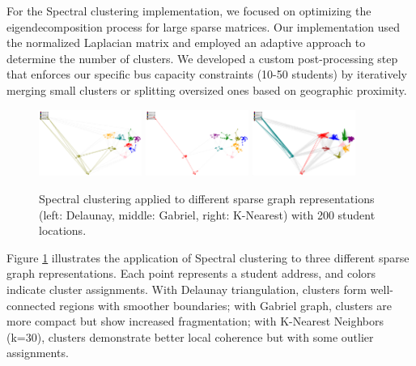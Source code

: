 For the Spectral clustering implementation, we focused on optimizing the eigendecomposition process for large sparse matrices. Our implementation used the normalized Laplacian matrix and employed an adaptive approach to determine the number of clusters. We developed a custom post-processing step that enforces our specific bus capacity constraints (10-50 students) by iteratively merging small clusters or splitting oversized ones based on geographic proximity.

\begin{figure}[htbp]
\centering
\includegraphics[width=0.3\textwidth]{./img/Spectral_Delaunay}
\hspace{0.2cm}
\includegraphics[width=0.3\textwidth]{./img/Spectral_Gabriel}
\hspace{0.2cm}
\includegraphics[width=0.3\textwidth]{./img/Spectral_K}

\caption{Spectral clustering applied to different sparse graph representations (left: Delaunay, middle: Gabriel, right: K-Nearest) with 200 student locations.}
\label{fig:spectral_clustering}
\end{figure}

Figure \ref{fig:spectral_clustering} illustrates the application of Spectral clustering to three different sparse graph representations. Each point represents a student address, and colors indicate cluster assignments. With Delaunay triangulation, clusters form well-connected regions with smoother boundaries; with Gabriel graph, clusters are more compact but show increased fragmentation; with K-Nearest Neighbors (k=30), clusters demonstrate better local coherence but with some outlier assignments.

